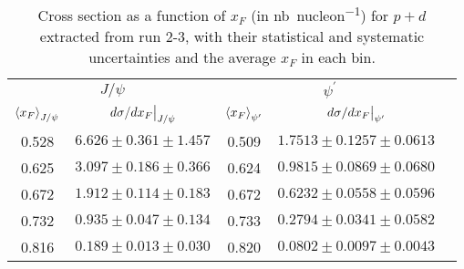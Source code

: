 \documentclass[../main.tex]{subfiles}
\begin{document}
\begin{table}[h!]
	\centering
	\caption{Cross section as a function of $x_F$ (in \unit{\nano\barn\per nucleon}) for $p+d$ extracted from run 2-3, with their statistical and systematic uncertainties and the average $x_F$ in each bin.}
	\begin{tabular}{cc|ccc}
		\hline
		\multicolumn{2}{c|}{$J/\psi$} & \multicolumn{2}{c}{$\psi^{\prime}$} &                                                                      \\ \cline{1-4}
		$\expval{x_F}_{J/\psi}$       & $\eval{d\sigma/dx_F}_{J/\psi}$      & $\expval{x_F}_{\psi^\prime}$ & $\eval{d\sigma/dx_F}_{\psi^\prime}$ & \\ \cline{1-4}
		\multicolumn{1}{c|}{0.528}    & $6.626\pm0.361\pm1.457$             & \multicolumn{1}{c|}{0.509}   & $1.7513\pm0.1257\pm0.0613$          & \\
		\multicolumn{1}{c|}{0.625}    & $3.097\pm0.186\pm0.366$             & \multicolumn{1}{c|}{0.624}   & $0.9815\pm0.0869\pm0.0680$          & \\
		\multicolumn{1}{c|}{0.672}    & $1.912\pm0.114\pm0.183$             & \multicolumn{1}{c|}{0.672}   & $0.6232\pm0.0558\pm0.0596$          & \\
		\multicolumn{1}{c|}{0.732}    & $0.935\pm0.047\pm0.134$             & \multicolumn{1}{c|}{0.733}   & $0.2794\pm0.0341\pm0.0582$          & \\
		\multicolumn{1}{c|}{0.816}    & $0.189\pm0.013\pm0.030$             & \multicolumn{1}{c|}{0.820}   & $0.0802\pm0.0097\pm0.0043$          & \\ \cline{1-4}
	\end{tabular}
\end{table}
\end{document}

